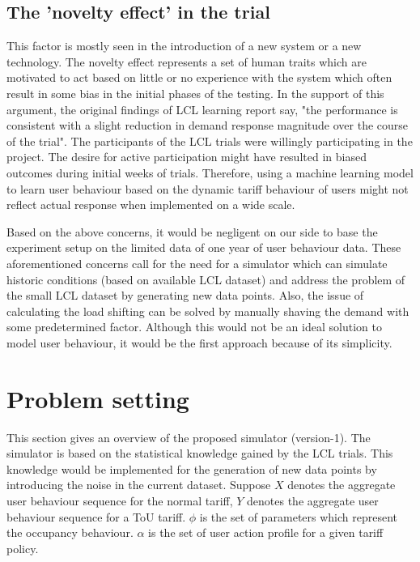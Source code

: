 \subsection{The 'novelty effect' in the trial}

This factor is mostly seen in the introduction of a new system or a new technology. The novelty effect represents a set of human traits which are motivated to act based on little or no experience with the system which often result in some bias in the initial phases of the testing. In the support of this argument, the original findings of LCL learning report say, "the performance is consistent with a slight reduction in demand response magnitude over the course of the trial". The participants of the LCL trials were willingly participating in the project. The desire for active participation might have resulted in biased outcomes during initial weeks of trials. Therefore, using a machine learning model to learn user behaviour based on the dynamic tariff behaviour of users might not reflect actual response when implemented on a wide scale.

Based on the above concerns, it would be negligent on our side to base the experiment setup on the limited data of one year of user behaviour data. These aforementioned concerns call for the need for a simulator which can simulate historic conditions (based on available LCL dataset) and address the problem of the small LCL dataset by generating new data points. Also, the issue of calculating the load shifting can be solved by manually shaving the demand with some predetermined factor. Although this would not be an ideal solution to model user behaviour, it would be the first approach because of its simplicity.



\section{Problem setting}
This section gives an overview of the proposed simulator (version-1). The simulator is based on the statistical knowledge gained by the LCL trials. This knowledge would be implemented for the generation of new data points by introducing the noise in the current dataset. Suppose $X$ denotes the aggregate user behaviour sequence for the normal tariff, $Y$ denotes the aggregate user behaviour sequence for a ToU tariff. $\phi$ is the set of parameters which represent the occupancy behaviour. $\alpha$ is the set of user action profile for a given tariff policy.

